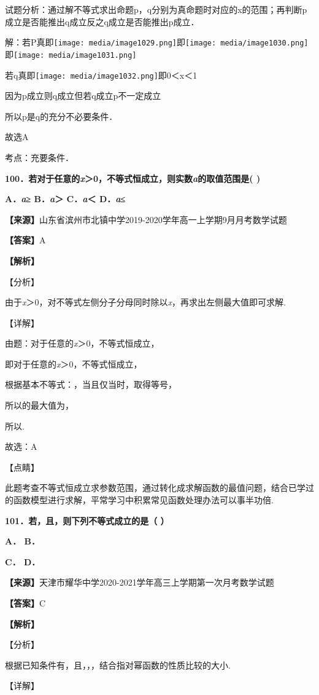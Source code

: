 试题分析：通过解不等式求出命题p，q分别为真命题时对应的x的范围；再判断p成立是否能推出q成立反之q成立是否能推出p成立．

解：若P真即\texttt{[image: media/image1029.png]}即\texttt{[image: media/image1030.png]}即\texttt{[image: media/image1031.png]}

若q真即\texttt{[image: media/image1032.png]}即0＜x＜1

因为p成立则q成立但若q成立p不一定成立

所以p是q的充分不必要条件．

故选A

考点：充要条件．

\textbf{100．若对于任意的\emph{x}＞0，不等式恒成立，则实数\emph{a}的取值范围是(
)}

\textbf{A．\emph{a}≥ B．\emph{a}＞ C．\emph{a}＜ D．\emph{a}≤}

\textbf{【来源】}山东省滨州市北镇中学2019-2020学年高一上学期9月月考数学试题

\textbf{【答案】}A

\textbf{【解析】}

【分析】

由于\emph{x}＞0，对不等式左侧分子分母同时除以\emph{x}，再求出左侧最大值即可求解.

【详解】

由题：对于任意的\emph{x}＞0，不等式恒成立，

即对于任意的\emph{x}＞0，不等式恒成立，

根据基本不等式：，当且仅当时，取得等号，

所以的最大值为，

所以.

故选：A

【点睛】

此题考查不等式恒成立求参数范围，通过转化成求解函数的最值问题，结合已学过的函数模型进行求解，平常学习中积累常见函数处理办法可以事半功倍.

\textbf{101．若，且，则下列不等式成立的是（ ）}

\textbf{A． B．}

\textbf{C． D．}

\textbf{【来源】}天津市耀华中学2020-2021学年高三上学期第一次月考数学试题

\textbf{【答案】}C

\textbf{【解析】}

【分析】

根据已知条件有，且，，，结合指对幂函数的性质比较的大小.

【详解】

